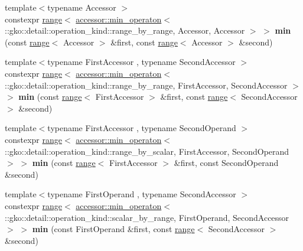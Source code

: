 \begin{DoxyCompactItemize}
\item 
\mbox{\label{namespacegko_a92f6a1d8d6ddb53fa5604c4fffab2215}} 
{\footnotesize template$<$typename Accessor $>$ }\\constexpr \hyperlink{classgko_1_1range}{range}$<$ \hyperlink{structgko_1_1accessor_1_1min__operaton}{accessor\+::min\+\_\+operaton}$<$ \+::gko\+::detail\+::operation\+\_\+kind\+::range\+\_\+by\+\_\+range, Accessor, Accessor $>$ $>$ {\bfseries min} (const \hyperlink{classgko_1_1range}{range}$<$ Accessor $>$ \&first, const \hyperlink{classgko_1_1range}{range}$<$ Accessor $>$ \&second)
\item 
\mbox{\label{namespacegko_aed7f057eac94682a4aa2735af799e56a}} 
{\footnotesize template$<$typename First\+Accessor , typename Second\+Accessor $>$ }\\constexpr \hyperlink{classgko_1_1range}{range}$<$ \hyperlink{structgko_1_1accessor_1_1min__operaton}{accessor\+::min\+\_\+operaton}$<$ \+::gko\+::detail\+::operation\+\_\+kind\+::range\+\_\+by\+\_\+range, First\+Accessor, Second\+Accessor $>$ $>$ {\bfseries min} (const \hyperlink{classgko_1_1range}{range}$<$ First\+Accessor $>$ \&first, const \hyperlink{classgko_1_1range}{range}$<$ Second\+Accessor $>$ \&second)
\item 
\mbox{\label{namespacegko_ac71f6df883e89643ce21f8adbb2ce07e}} 
{\footnotesize template$<$typename First\+Accessor , typename Second\+Operand $>$ }\\constexpr \hyperlink{classgko_1_1range}{range}$<$ \hyperlink{structgko_1_1accessor_1_1min__operaton}{accessor\+::min\+\_\+operaton}$<$ \+::gko\+::detail\+::operation\+\_\+kind\+::range\+\_\+by\+\_\+scalar, First\+Accessor, Second\+Operand $>$ $>$ {\bfseries min} (const \hyperlink{classgko_1_1range}{range}$<$ First\+Accessor $>$ \&first, const Second\+Operand \&second)
\item 
\mbox{\label{namespacegko_af612eba2f92e21c5809701a80864565d}} 
{\footnotesize template$<$typename First\+Operand , typename Second\+Accessor $>$ }\\constexpr \hyperlink{classgko_1_1range}{range}$<$ \hyperlink{structgko_1_1accessor_1_1min__operaton}{accessor\+::min\+\_\+operaton}$<$ \+::gko\+::detail\+::operation\+\_\+kind\+::scalar\+\_\+by\+\_\+range, First\+Operand, Second\+Accessor $>$ $>$ {\bfseries min} (const First\+Operand \&first, const \hyperlink{classgko_1_1range}{range}$<$ Second\+Accessor $>$ \&second)

\end{DoxyCompactItemize}
